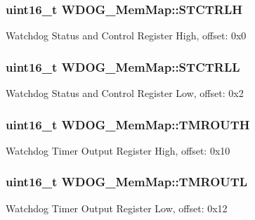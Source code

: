 \subsubsection[{S\+T\+C\+T\+R\+L\+H}]{\setlength{\rightskip}{0pt plus 5cm}uint16\+\_\+t W\+D\+O\+G\+\_\+\+Mem\+Map\+::\+S\+T\+C\+T\+R\+L\+H}\label{struct_w_d_o_g___mem_map_ae48286fe7c8ceabfd9aa616e40b52a35}
Watchdog Status and Control Register High, offset\+: 0x0 \hypertarget{struct_w_d_o_g___mem_map_a0eb14eade4d91bd2f2f82910d633e0aa}{}
\subsubsection[{S\+T\+C\+T\+R\+L\+L}]{\setlength{\rightskip}{0pt plus 5cm}uint16\+\_\+t W\+D\+O\+G\+\_\+\+Mem\+Map\+::\+S\+T\+C\+T\+R\+L\+L}\label{struct_w_d_o_g___mem_map_a0eb14eade4d91bd2f2f82910d633e0aa}
Watchdog Status and Control Register Low, offset\+: 0x2 \hypertarget{struct_w_d_o_g___mem_map_a47bce5f5c4ea1609ec9d0055e05e9b73}{}
\subsubsection[{T\+M\+R\+O\+U\+T\+H}]{\setlength{\rightskip}{0pt plus 5cm}uint16\+\_\+t W\+D\+O\+G\+\_\+\+Mem\+Map\+::\+T\+M\+R\+O\+U\+T\+H}\label{struct_w_d_o_g___mem_map_a47bce5f5c4ea1609ec9d0055e05e9b73}
Watchdog Timer Output Register High, offset\+: 0x10 \hypertarget{struct_w_d_o_g___mem_map_a873a6456ac56cb42a5a2ff66ddfefa3c}{}
\subsubsection[{T\+M\+R\+O\+U\+T\+L}]{\setlength{\rightskip}{0pt plus 5cm}uint16\+\_\+t W\+D\+O\+G\+\_\+\+Mem\+Map\+::\+T\+M\+R\+O\+U\+T\+L}\label{struct_w_d_o_g___mem_map_a873a6456ac56cb42a5a2ff66ddfefa3c}
Watchdog Timer Output Register Low, offset\+: 0x12 \hypertarget{struct_w_d_o_g___mem_map_ae5ac6a42d85914d2f739b5377734f87a}{}
